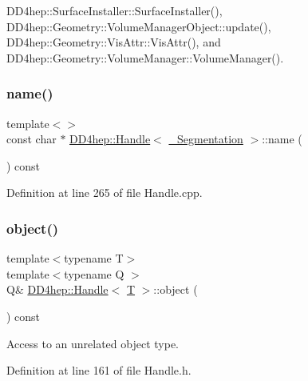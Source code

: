 D\+D4hep\+::\+Surface\+Installer\+::\+Surface\+Installer(), D\+D4hep\+::\+Geometry\+::\+Volume\+Manager\+Object\+::update(), D\+D4hep\+::\+Geometry\+::\+Vis\+Attr\+::\+Vis\+Attr(), and D\+D4hep\+::\+Geometry\+::\+Volume\+Manager\+::\+Volume\+Manager().

\hypertarget{class_d_d4hep_1_1_handle_a1a15b80c3f3e7e739a70b99f60a42092}{}\label{class_d_d4hep_1_1_handle_a1a15b80c3f3e7e739a70b99f60a42092} 
\subsubsection{\texorpdfstring{name()}{name()}\hspace{0.1cm}{\footnotesize\ttfamily [2/2]}}
{\footnotesize\ttfamily template$<$$>$ \\
const char $\ast$ \hyperlink{class_d_d4hep_1_1_handle}{D\+D4hep\+::\+Handle}$<$ \hyperlink{_handle_8cpp_a2cf2a89ef24384817ed33748f1243510}{\+\_\+\+Segmentation} $>$\+::name (\begin{DoxyParamCaption}{ }\end{DoxyParamCaption}) const}



Definition at line 265 of file Handle.\+cpp.

\hypertarget{class_d_d4hep_1_1_handle_abef3218a7399500084fc290a711bf048}{}\label{class_d_d4hep_1_1_handle_abef3218a7399500084fc290a711bf048} 
\subsubsection{\texorpdfstring{object()}{object()}}
{\footnotesize\ttfamily template$<$typename T$>$ \\
template$<$typename Q $>$ \\
Q\& \hyperlink{class_d_d4hep_1_1_handle}{D\+D4hep\+::\+Handle}$<$ \hyperlink{class_t}{T} $>$\+::object (\begin{DoxyParamCaption}{ }\end{DoxyParamCaption}) const\hspace{0.3cm}{\ttfamily [inline]}}



Access to an unrelated object type. 



Definition at line 161 of file Handle.\+h.


